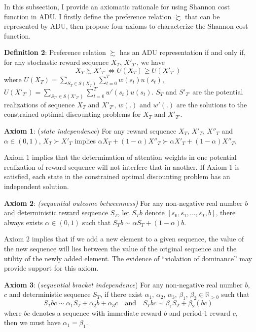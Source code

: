 \documentclass[
  12pt,
]{article}
\begin{document}
In this subsection, I provide an axiomatic rationale for using Shannon
cost function in ADU. I firstly define the preference relation
\(\succsim\) that can be represented by ADU, then propose four axioms to
characterize the Shannon cost function.

\textbf{Definition 2}: Preference relation \(\succsim\) has an ADU
representation if and only if, for any stochastic reward sequence
\(X_T\), \(X'_{T'}\), we have \[
X_T \succsim X'_{T'} \Longleftrightarrow U(X_T)\geq U(X'_{T'})
\]where
\(U(X_T)=\sum_{S_T\in\mathcal{S}(X_T)}\sum_{t=0}^T w(s_t)u(s_t)\),
\(U(X'_{T'})=\sum_{S_{T'}\in\mathcal{S}(X'_{T'})}\sum_{t=0}^{T'}w'(s_t)u(s_t)\).
\(S_T\) and \(S'_{T'}\) are the potential realizations of sequence
\(X_T\) and \(X'_{T'}\), \(w(.)\) and \(w'(.)\) are the solutions to the
constrained optimal discounting problems for \(X_T\) and \(X'_{T'}\).

\textbf{Axiom 1}: (\emph{state independence}) For any reward sequence
\(X_T\), \(X'_T\), \(X''_T\) and \(\alpha\in(0,1)\), \(X_T\succ X'_T\)
implies
\(\alpha X_T+ (1-\alpha)X''_T \succ \alpha X'_T + (1-\alpha) X''_T\).

Axiom 1 implies that the determination of attention weights in one
potential realization of reward sequence will not interfere that in
another. If Axiom 1 is satisfied, each state in the constrained optimal
discounting problem has an independent solution.

\textbf{Axiom 2}: \emph{(sequential outcome betweenness)} For any
non-negative real number \(b\) and deterministic reward sequence
\(S_T\), let \(S_Tb\) denote \([s_0,s_1,...,s_T,b]\), there always
exists \(\alpha\in(0,1)\) such that \(S_Tb\sim \alpha S_T+(1-\alpha)b\).

Axiom 2 implies that if we add a new element to a given sequence, the
value of the new sequence will lies between the value of the original
sequence and the utility of the newly added element. The evidence of
``violation of dominance'' \citep{scholten_better_2014} may provide
support for this axiom.

\textbf{Axiom 3}: (\emph{sequential} \emph{bracket independence}) For
any non-negative real number \(b\), \(c\) and deterministic sequence
\(S_T\), if there exist \(\alpha_1\), \(\alpha_2\), \(\alpha_3\),
\(\beta_1\), \(\beta_2\in \mathbb{R}_{>0}\) such that
\[S_Tbc\sim \alpha_1S_T+\alpha_2b+\alpha_3c \quad\text{and}\quad S_Tbc\sim \beta_1S_T+\beta_2(bc)\]
where \(bc\) denotes a sequence with immediate reward \(b\) and period-1
reward \(c\), then we must have \(\alpha_1=\beta_1\).
\end{document}
